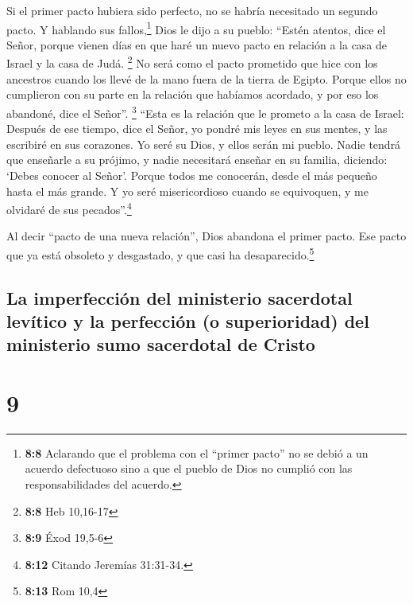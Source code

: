  Si el primer pacto hubiera sido perfecto, no se habría
necesitado un segundo pacto.  Y hablando sus
fallos,\footnote{\textbf{8:8} Aclarando que el problema con el ``primer
  pacto'' no se debió a un acuerdo defectuoso sino a que el pueblo de
  Dios no cumplió con las responsabilidades del acuerdo.} Dios le dijo a
su pueblo: ``Estén atentos, dice el Señor, porque vienen días en que
haré un nuevo pacto en relación a la casa de Israel y la casa de Judá.
\footnote{\textbf{8:8} Heb 10,16-17}  No será como el
pacto prometido que hice con los ancestros cuando los llevé de la mano
fuera de la tierra de Egipto. Porque ellos no cumplieron con su parte en
la relación que habíamos acordado, y por eso los abandoné, dice el
Señor''. \footnote{\textbf{8:9} Éxod 19,5-6}  ``Esta es
la relación que le prometo a la casa de Israel: Después de ese tiempo,
dice el Señor, yo pondré mis leyes en sus mentes, y las escribiré en sus
corazones. Yo seré su Dios, y ellos serán mi pueblo. 
Nadie tendrá que enseñarle a su prójimo, y nadie necesitará enseñar en
su familia, diciendo: `Debes conocer al Señor'. Porque todos me
conocerán, desde el más pequeño hasta el más grande.  Y
yo seré misericordioso cuando se equivoquen, y me olvidaré de sus
pecados''.\footnote{\textbf{8:12} Citando Jeremías 31:31-34.}

 Al decir ``pacto de una nueva relación'', Dios abandona
el primer pacto. Ese pacto que ya está obsoleto y desgastado, y que casi
ha desaparecido.\footnote{\textbf{8:13} Rom 10,4}

\hypertarget{la-imperfecciuxf3n-del-ministerio-sacerdotal-levuxedtico-y-la-perfecciuxf3n-o-superioridad-del-ministerio-sumo-sacerdotal-de-cristo}{%
\subsection{La imperfección del ministerio sacerdotal levítico y la
perfección (o superioridad) del ministerio sumo sacerdotal de
Cristo}\label{la-imperfecciuxf3n-del-ministerio-sacerdotal-levuxedtico-y-la-perfecciuxf3n-o-superioridad-del-ministerio-sumo-sacerdotal-de-cristo}}

\hypertarget{section-8}{%
\section{9}\label{section-8}}

